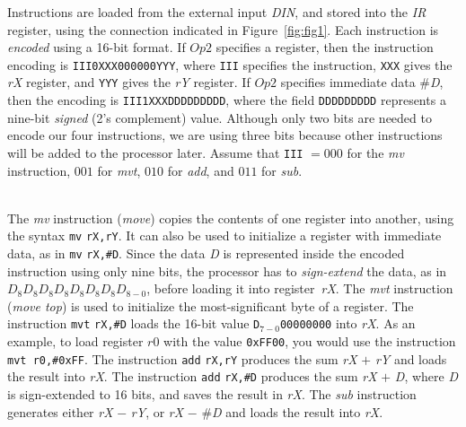 \documentclass[epsfig,10pt,fullpage]{article} \addtolength{\textwidth}{1.5in}
\begin{document}
\noindent
Instructions are loaded from the external input {\it DIN}, and stored into the {\it IR} register, 
using the connection indicated in Figure~\ref{fig:fig1}. Each instruction is {\it encoded} using 
a 16-bit format. If $Op2$ specifies a register, then the instruction encoding is 
\texttt{III0XXX000000YYY}, where \texttt{III} specifies the instruction, \texttt{XXX} gives 
the {\it rX} register, and \texttt{YYY} gives the {\it rY} register. If $Op2$ specifies 
immediate data \#{\it D}, then the encoding is \texttt{III1XXXDDDDDDDDD}, where the field 
\texttt{DDDDDDDDD} represents a nine-bit {\it signed} (2's complement) value. Although 
only two bits are needed to encode our four instructions, we are using three bits because 
other instructions will be added to the processor later. Assume that \texttt{III} $= 000$ for
the {\it mv} instruction, $001$ for {\it mvt}, $010$ for {\it add}, and $011$ for {\it sub}. 

~\\
The {\it mv} instruction ({\it move}) copies the contents of one register into 
another, using the syntax \texttt{mv} \texttt{rX,rY}. It can also be used to initialize a 
register with immediate data, as in \texttt{mv} \texttt{rX,\#D}.  Since the data {\it D} 
is represented inside the encoded instruction using only nine bits, the processor has to 
{\it sign-extend} the data, as in \texttt{$D_8D_8D_8D_8D_8D_8D_8$$D_{8-0}$}, before loading it into 
register~{\it rX}.  The {\it mvt} instruction ({\it move top}) is used to initialize the 
most-significant byte of a register.  The instruction \texttt{mvt} \texttt{rX,\#D} 
loads the 16-bit value 
\texttt{D$_{7-0}$00000000} into {\it rX}. As an example, to load register $r0$ with the 
value \texttt{0xFF00}, you would use the instruction \texttt{mvt r0,\#0xFF}. The instruction 
\texttt{add} \texttt{rX,rY} produces the sum {\it rX} $+$ {\it rY} and loads the result 
into {\it rX}. The instruction \texttt{add} \texttt{rX,\#D} produces the 
sum {\it rX} $+$ {\it D}, where {\it D} is sign-extended to 16 bits, and saves the result 
in {\it rX}. The {\it sub} instruction generates 
either {\it rX} $-$ {\it rY}, or {\it rX} $-$ \#{\it D} and loads the result into {\it rX}.
\end{document}
